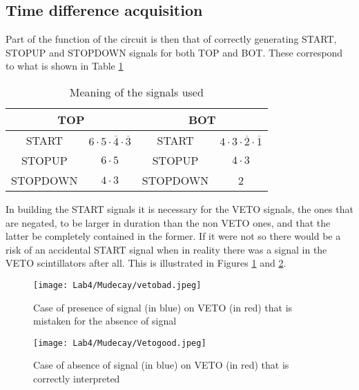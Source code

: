 \documentclass[10pt,a4paper,twocolumn]{article}
\begin{document}
\subsection{Time difference acquisition}

Part of the function of the circuit is then that of correctly generating START, STOPUP and STOPDOWN signals for both TOP and BOT. These correspond to what is shown in Table \ref{signaltable}


\begin{table}[h]
\centering
\begin{tabular}{|c|c|c|c|}
\hline
\multicolumn{2}{|c|}{TOP}&\multicolumn{2}{|c|}{BOT}\\
\hline
START &  $6\cdot 5\cdot \overline{4}\cdot \overline{3}$ & START & $4\cdot 3\cdot \overline{2}\cdot \overline{1}$\\
\hline
STOPUP & $6\cdot 5$ & STOPUP  &  $4\cdot 3$   \\
\hline
STOPDOWN & $4\cdot 3$ & STOPDOWN  &  2   \\
\hline
\end{tabular} 
\caption{Meaning of the signals used}
\label{signaltable}
\end{table}

In building the START signals it is necessary for the VETO signals, the ones that are negated, to be larger in duration than the non VETO ones, and that the latter be completely contained in the former. If it were not so there would be a risk of an accidental START signal when in reality there was a signal in the VETO scintillators after all. This is illustrated in Figures \ref{vetobad} and \ref{vetogood}.

\begin{figure}[h!]
\centering
\caption{Case of presence of signal (in blue) on VETO (in red) that is mistaken for the absence of signal}
\texttt{[image: Lab4/Mudecay/vetobad.jpeg]} 
\label{vetobad}
\end{figure}

\begin{figure}[h!]
\centering
\caption{Case of absence of signal (in blue) on VETO (in red) that is correctly interpreted}
\texttt{[image: Lab4/Mudecay/Vetogood.jpeg]} 
\label{vetogood}
\end{figure}
\end{document}

